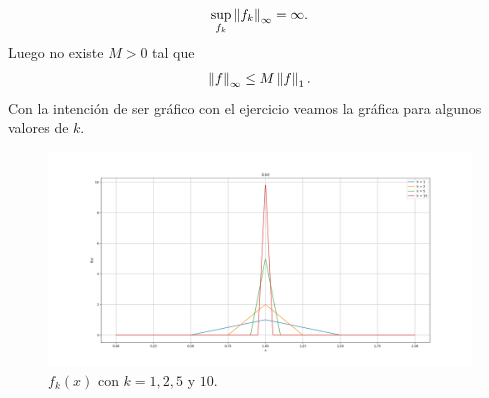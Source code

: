 \begin{homeworkProblem}
\begin{solution}
\begin{enumerate}[(i)]
      \begin{align*}
        \sup_{\substack{f_k}}\left\|f_{k}\right\|_{\infty}=\infty.
      \end{align*}
      Luego no existe $M>0$ tal que 
      \begin{align*}
        \left\|f\right\|_{\infty}\leq M\left\|f\right\|_{1}.
      \end{align*}
      Con la intención de ser gráfico con el ejercicio veamos la gráfica para algunos valores de $k$.
      \begin{figure}[H]
      \begin{center}
        \includegraphics[scale=0.33]{Figures/graficacontraejemplo.png}
      \end{center}
        \caption{$f_k(x)$ con $k=1,2,5$ y $10$.}
      \end{figure} 
    \end{enumerate}
  \end{solution}
\end{homeworkProblem}
